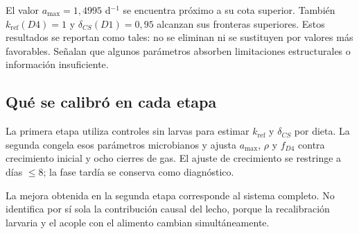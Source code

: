 El valor $a_{\max}=1{,}4995$ d$^{-1}$ se encuentra próximo a su cota
superior. También $k_{\mathrm{ref}}(D4)=1$ y
$\delta_{CS}(D1)=0{,}95$ alcanzan sus fronteras superiores. Estos
resultados se reportan como tales: no se eliminan ni se sustituyen por
valores más favorables. Señalan que algunos parámetros absorben
limitaciones estructurales o información insuficiente.

\subsection{Qué se calibró en cada etapa}

La primera etapa utiliza controles sin larvas para estimar
$k_{\mathrm{ref}}$ y $\delta_{CS}$ por dieta. La segunda congela esos
parámetros microbianos y ajusta $a_{\max}$, $\rho$ y $f_{D4}$ contra
crecimiento inicial y ocho cierres de gas. El ajuste de crecimiento se
restringe a días $\leq8$; la fase tardía se conserva como diagnóstico.

La mejora obtenida en la segunda etapa corresponde al sistema completo.
No identifica por sí sola la contribución causal del lecho, porque la
recalibración larvaria y el acople con el alimento cambian
simultáneamente.
